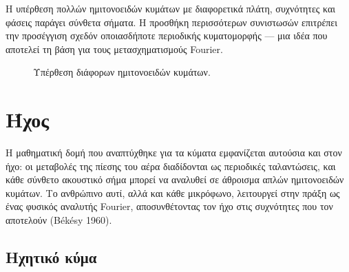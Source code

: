 Η υπέρθεση πολλών ημιτονοειδών κυμάτων με διαφορετικά πλάτη, συχνότητες
και φάσεις παράγει σύνθετα σήματα. Η προσθήκη περισσότερων συνιστωσών
επιτρέπει την προσέγγιση σχεδόν οποιασδήποτε περιοδικής κυματομορφής ---
μια ιδέα που αποτελεί τη βάση για τους μετασχηματισμούς Fourier.

\begin{figure}[htbp]
\centering
{}
\caption{
Υπέρθεση διάφορων ημιτονοειδών κυμάτων.
}
\label{fig:fourier_superposition}
\end{figure}

\section{Ήχος}\label{ux3aeux3c7ux3bfux3c2}

Η μαθηματική δομή που αναπτύχθηκε για τα κύματα εμφανίζεται αυτούσια και
στον ήχο: οι μεταβολές της πίεσης του αέρα διαδίδονται ως περιοδικές
ταλαντώσεις, και κάθε σύνθετο ακουστικό σήμα μπορεί να αναλυθεί σε
άθροισμα απλών ημιτονοειδών κυμάτων. Το ανθρώπινο αυτί, αλλά και κάθε
μικρόφωνο, λειτουργεί στην πράξη ως ένας φυσικός αναλυτής Fourier,
αποσυνθέτοντας τον ήχο στις συχνότητες που τον αποτελούν (Békésy 1960).

\subsection{Ηχητικό
κύμα}\label{ux3b7ux3c7ux3b7ux3c4ux3b9ux3baux3cc-ux3baux3cdux3bcux3b1}


